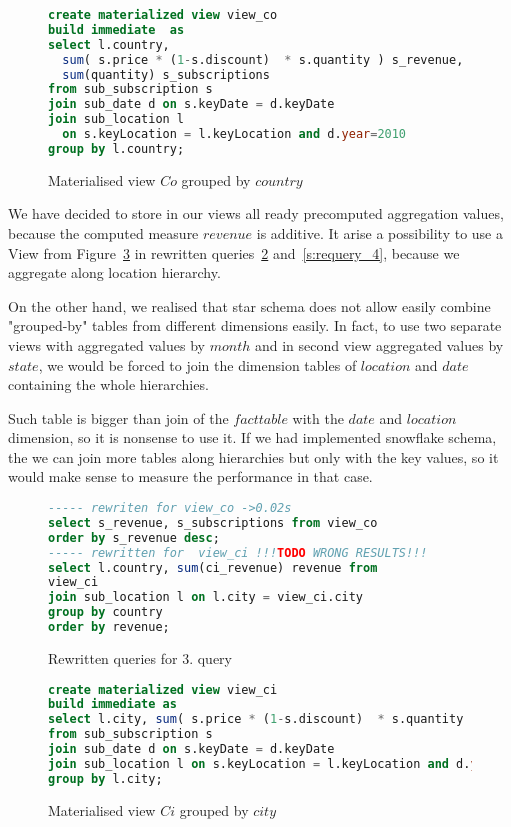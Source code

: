 \begin{figure}[!hbp]
\begin{lstlisting}[language=sql] 
create materialized view view_co 
build immediate  as
select l.country, 
  sum( s.price * (1-s.discount)  * s.quantity ) s_revenue,
  sum(quantity) s_subscriptions
from sub_subscription s
join sub_date d on s.keyDate = d.keyDate
join sub_location l 
  on s.keyLocation = l.keyLocation and d.year=2010
group by l.country; 
\end{lstlisting}
\caption{\label{s:view_co} Materialised view ${Co}$ grouped by $country$}
\end{figure}

We have decided to store in our views all ready precomputed aggregation values, because the computed 
measure $revenue$ is additive. It arise a possibility to use a View from Figure~\ref{s:view_ci} in rewritten queries~\ref{s:requery_3} and~\ref{s:requery_4}, because we aggregate along location hierarchy.

On the other hand, we realised that star schema does not allow easily combine "grouped-by" tables from different dimensions easily. In fact, to use two separate views with aggregated values by $month$ and in second view aggregated values by $state$, we would be forced to join the dimension tables of $location$ and $date$ containing the whole hierarchies.

Such table is bigger than join of the $fact table$ with the $date$ and $location$ dimension, so it is nonsense to use it.
If we had implemented snowflake schema, the we can join more tables along hierarchies but only with the key values,
so it would make sense to measure the performance in that case.


\begin{figure}[!hbp]
\begin{lstlisting}[language=sql] 
----- rewriten for view_co ->0.02s
select s_revenue, s_subscriptions from view_co 
order by s_revenue desc;
----- rewritten for  view_ci !!!TODO WRONG RESULTS!!!
select l.country, sum(ci_revenue) revenue from
view_ci
join sub_location l on l.city = view_ci.city
group by country
order by revenue;
\end{lstlisting}
\caption{\label{s:requery_3} Rewritten queries for $3$. query}
\end{figure}

\begin{figure}[!hbp]
\begin{lstlisting}[language=sql] 
create materialized view view_ci 
build immediate as
select l.city, sum( s.price * (1-s.discount)  * s.quantity ) ci_revenue  
from sub_subscription s
join sub_date d on s.keyDate = d.keyDate
join sub_location l on s.keyLocation = l.keyLocation and d.year=2010
group by l.city;
\end{lstlisting}
\caption{\label{s:view_ci} Materialised view ${Ci}$ grouped by $city$}
\end{figure}

